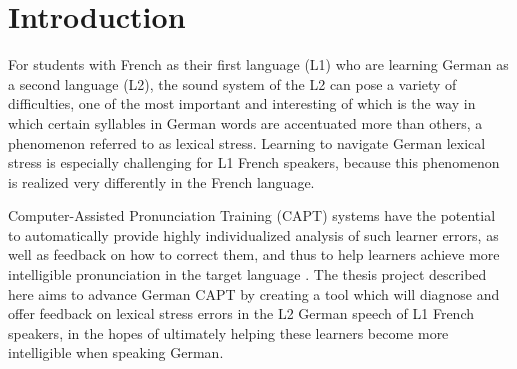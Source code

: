 %

%
\chapter{Introduction}
\label{chap:intro}




For students with French as their first language (L1) who are learning German as a second language (L2), the sound system of the L2 can pose a variety of difficulties, one of the most important and interesting of which is the way in which certain syllables in German words are accentuated more than others, a phenomenon referred to as lexical stress. Learning to navigate German lexical stress is especially challenging for L1 French speakers, because this phenomenon is realized very differently in the French language. 

Computer-Assisted Pronunciation Training (CAPT) systems
have the potential to automatically provide highly individualized analysis of such learner errors, as well as feedback on how to correct them, and thus to help learners achieve more intelligible 
pronunciation in the target language \citep{Witt2012}. 
%
The thesis project described here aims to advance 
German CAPT %
by creating a tool which will diagnose and offer feedback on lexical stress errors in the L2 German speech of L1 French speakers, in the hopes of ultimately helping these learners 
become more intelligible when speaking German.

